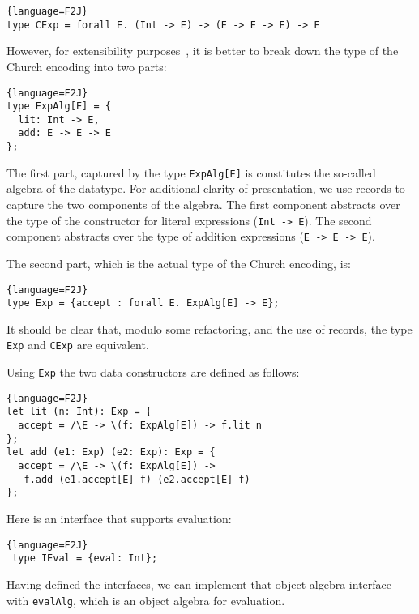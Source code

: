\begin{lstlisting}{language=F2J}
type CExp = forall E. (Int -> E) -> (E -> E -> E) -> E
\end{lstlisting}

\noindent However, for extensibility purposes~\cite{}, it is better to break
down the type of the Church encoding into two parts: 

\begin{lstlisting}{language=F2J}
type ExpAlg[E] = {
  lit: Int -> E, 
  add: E -> E -> E
};
\end{lstlisting}

\noindent The first part, captured by the type \lstinline{ExpAlg[E]}
is constitutes the so-called algebra of the datatype. For additional 
clarity of presentation, we use records to capture the two components
of the algebra. The first component abstracts over the type of the
constructor for literal expressions (\lstinline{Int -> E}). The second 
component abstracts over the type of addition expressions 
(\lstinline{E -> E -> E}). 

The second part, which is the actual type of the Church encoding, is:

\begin{lstlisting}{language=F2J}
type Exp = {accept : forall E. ExpAlg[E] -> E};
\end{lstlisting}

\noindent It should be clear that, modulo some refactoring, and the
use of records, the type \lstinline{Exp} and \lstinline{CExp}
are equivalent.

Using \lstinline{Exp} the two data constructors are defined as follows:

\begin{lstlisting}{language=F2J}
let lit (n: Int): Exp = {
  accept = /\E -> \(f: ExpAlg[E]) -> f.lit n
};
let add (e1: Exp) (e2: Exp): Exp = {
  accept = /\E -> \(f: ExpAlg[E]) -> 
   f.add (e1.accept[E] f) (e2.accept[E] f)
};
\end{lstlisting}

Here is an interface that supports evaluation:

\begin{lstlisting}{language=F2J}
 type IEval = {eval: Int};
\end{lstlisting}

Having defined the interfaces, we can implement that object algebra interface
with \lstinline$evalAlg$, which is an object algebra for evaluation. 
\begin{comment}
  \begin{lstlisting}{language=F2J}
    let evalAlg: ExpAlg[IEval] = {
      lit = \(x: Int) -> {eval = x},
      add = \(x: IEval) (y: IEval) -> {
        eval = x.eval + y.eval
      }
    };
  \end{lstlisting}
\end{comment}

